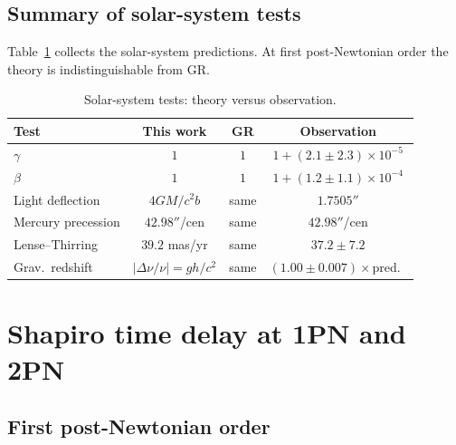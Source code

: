 \documentclass[aps,prd,onecolumn,superscriptaddress,nofootinbib,showpacs,12pt]{revtex4-2}
\begin{document}
\subsection{Summary of solar-system tests}\label{sec:solar_summary}

Table~\ref{tab:solar} collects the solar-system predictions.
At first post-Newtonian order the theory is indistinguishable
from GR.

\begin{table}[ht]
\caption{Solar-system tests: theory versus observation.
\label{tab:solar}}
\begin{ruledtabular}
\begin{tabular}{lccc}
Test & This work & GR & Observation \\
\hline
$\gamma$ & $1$ & $1$ & $1 + (2.1\pm 2.3)\!\times\!10^{-5}$ \\
$\beta$ & $1$ & $1$ & $1 + (1.2\pm 1.1)\!\times\!10^{-4}$ \\
Light deflection & $4GM/c^{2}b$ & same & $1.7505''$ \\
Mercury precession & $42.98''$/cen & same & $42.98''$/cen \\
Lense--Thirring & $39.2$ mas/yr & same & $37.2\pm7.2$ \\
Grav.\ redshift & $|\Delta\nu/\nu|=gh/c^{2}$ & same &
  $(1.00 \pm 0.007)\times$pred.\ \\
\end{tabular}
\end{ruledtabular}
\end{table}

\section{Shapiro time delay at 1PN and 2PN}\label{sec:shapiro}

\subsection{First post-Newtonian order}\label{sec:shapiro_1pn}
\end{document}
